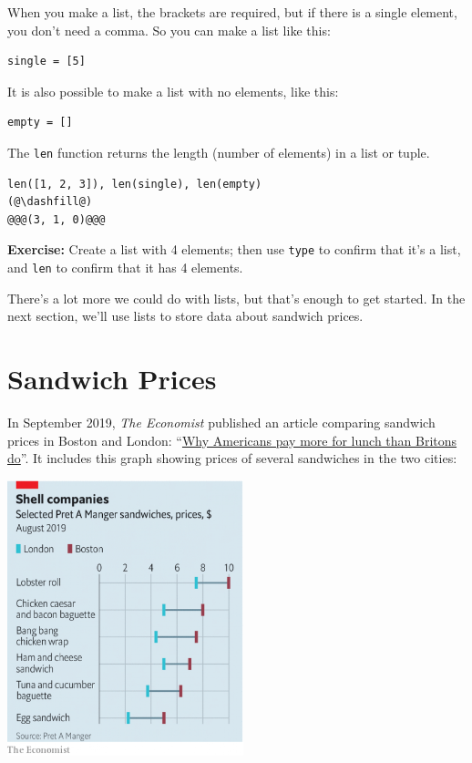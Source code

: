 When you make a list, the brackets are required, but if there is a
single element, you don't need a comma. So you can make a list like
this:

\begin{lstlisting}[]
single = [5]
\end{lstlisting}

It is also possible to make a list with no elements, like this:

\begin{lstlisting}[]
empty = []
\end{lstlisting}

The \passthrough{\lstinline!len!} function returns the length (number of
elements) in a list or tuple.

\begin{lstlisting}[]
len([1, 2, 3]), len(single), len(empty)
(@\dashfill@)
@@@(3, 1, 0)@@@
\end{lstlisting}

\textbf{Exercise:} Create a list with 4 elements; then use
\passthrough{\lstinline!type!} to confirm that it's a list, and
\passthrough{\lstinline!len!} to confirm that it has 4 elements.

There's a lot more we could do with lists, but that's enough to get
started. In the next section, we'll use lists to store data about
sandwich prices.

\hypertarget{sandwich-prices}{%
\section{Sandwich Prices}\label{sandwich-prices}}

In September 2019, \emph{The Economist} published an article comparing
sandwich prices in Boston and London:
``\href{https://www.economist.com/finance-and-economics/2019/09/07/why-americans-pay-more-for-lunch-than-britons-do}{Why
Americans pay more for lunch than Britons do}''. It includes this graph
showing prices of several sandwiches in the two cities:

\begin{center}
\includegraphics[width=2.7in]{chapters/figs/20190907_FNC941.png}
\end{center}

